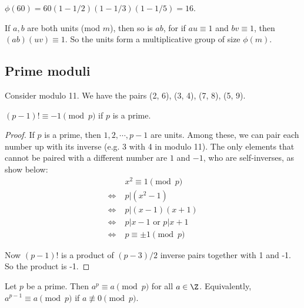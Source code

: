 \documentclass[a4paper]{article}
\begin{document}
  \begin{eg}
    $\phi(60) = 60(1 - 1/2)(1 - 1/3)(1 - 1/5) = 16$.
  \end{eg}

  \begin{note}
    If $a, b$ are both units (mod $m$), then so is $ab$, for if $au \equiv 1$ and $bv \equiv 1$, then $(ab)(uv)\equiv 1$. So the units form a multiplicative group of size $\phi(m)$.
  \end{note}

  \subsection{Prime moduli}
  \begin{eg}
    Consider modulo 11. We have the pairs (2, 6), (3, 4), (7, 8), (5, 9).
  \end{eg}

  \begin{thm}
    $(p - 1)! \equiv -1\pmod p$ if $p$ is a prime.
  \end{thm}

  \begin{proof}
    If $p$ is a prime, then $1, 2, \cdots, p - 1$ are units. Among these, we can pair each number up with its inverse (e.g. 3 with 4 in modulo 11). The only elements that cannot be paired with a different number are $1$ and $-1$, who are self-inverses, as show below:
    \begin{align*}
      &\;x^2 \equiv 1\pmod p\\
      \Leftrightarrow&\; p | (x^2 - 1)\\
      \Leftrightarrow&\; p | (x - 1)(x + 1)\\
      \Leftrightarrow&\; p | x - 1 \text{ or } p | x + 1\\
      \Leftrightarrow&\; p \equiv \pm 1\pmod p
    \end{align*}

    Now $(p - 1)!$ is a product of $(p - 3)/2$ inverse pairs together with 1 and -1. So the product is -1.
  \end{proof}

  \begin{thm}
    Let $p$ be a prime. Then $a^p \equiv a\pmod p$ for all $a\in \Z$. Equivalently, $a^{p - 1}\equiv a\pmod p$ if $a\not\equiv 0 \pmod p$.
  \end{thm}
\end{document}

